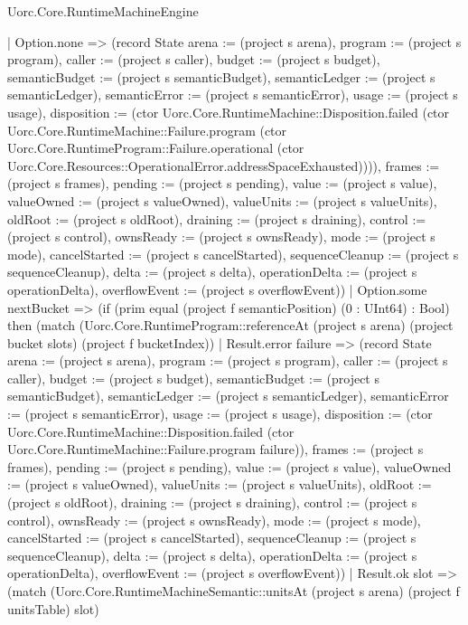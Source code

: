 \begin{lexlean}{Uorc.Core.RuntimeMachineEngine}
\begin{semanticmodule}
{        | Option.none => (record State {arena := (project s arena), program := (project s program), caller := (project s caller), budget := (project s budget), semanticBudget := (project s semanticBudget), semanticLedger := (project s semanticLedger), semanticError := (project s semanticError), usage := (project s usage), disposition := (ctor Uorc.Core.RuntimeMachine::Disposition.failed (ctor Uorc.Core.RuntimeMachine::Failure.program (ctor Uorc.Core.RuntimeProgram::Failure.operational (ctor Uorc.Core.Resources::OperationalError.addressSpaceExhausted)))), frames := (project s frames), pending := (project s pending), value := (project s value), valueOwned := (project s valueOwned), valueUnits := (project s valueUnits), oldRoot := (project s oldRoot), draining := (project s draining), control := (project s control), ownsReady := (project s ownsReady), mode := (project s mode), cancelStarted := (project s cancelStarted), sequenceCleanup := (project s sequenceCleanup), delta := (project s delta), operationDelta := (project s operationDelta), overflowEvent := (project s overflowEvent)})
        | Option.some nextBucket => (if (prim equal (project f semanticPosition) (0 : UInt64) : Bool) then (match (Uorc.Core.RuntimeProgram::referenceAt (project s arena) (project bucket slots) (project f bucketIndex))
          | Result.error failure => (record State {arena := (project s arena), program := (project s program), caller := (project s caller), budget := (project s budget), semanticBudget := (project s semanticBudget), semanticLedger := (project s semanticLedger), semanticError := (project s semanticError), usage := (project s usage), disposition := (ctor Uorc.Core.RuntimeMachine::Disposition.failed (ctor Uorc.Core.RuntimeMachine::Failure.program failure)), frames := (project s frames), pending := (project s pending), value := (project s value), valueOwned := (project s valueOwned), valueUnits := (project s valueUnits), oldRoot := (project s oldRoot), draining := (project s draining), control := (project s control), ownsReady := (project s ownsReady), mode := (project s mode), cancelStarted := (project s cancelStarted), sequenceCleanup := (project s sequenceCleanup), delta := (project s delta), operationDelta := (project s operationDelta), overflowEvent := (project s overflowEvent)})
          | Result.ok slot => (match (Uorc.Core.RuntimeMachineSemantic::unitsAt (project s arena) (project f unitsTable) slot)
}
\end{semanticmodule}
\end{lexlean}
